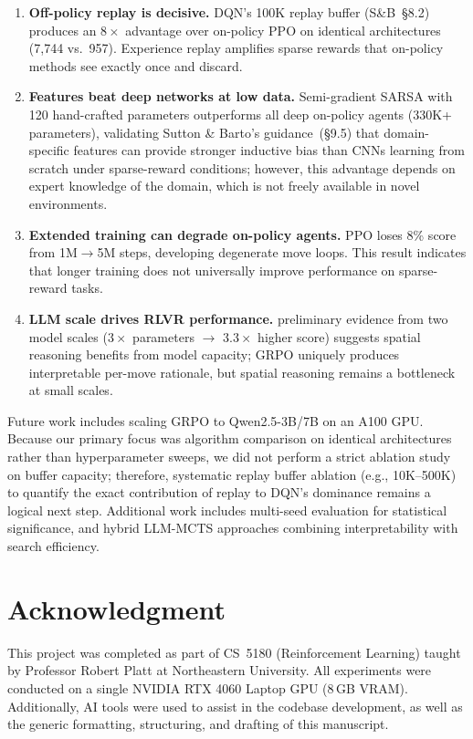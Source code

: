 \documentclass[letterpaper]{article}
\begin{document}
\begin{enumerate}
    \item \textbf{Off-policy replay is decisive.} DQN's 100K replay buffer (S\&B~\S8.2) produces an $8\times$ advantage over on-policy PPO on identical architectures (7,744 vs.\ 957). Experience replay amplifies sparse rewards that on-policy methods see exactly once and discard.

    \item \textbf{Features beat deep networks at low data.} Semi-gradient SARSA with 120 hand-crafted parameters outperforms all deep on-policy agents (330K+ parameters), validating Sutton \& Barto's guidance~(\S9.5) that domain-specific features can provide stronger inductive bias than CNNs learning from scratch under sparse-reward conditions; however, this advantage depends on expert knowledge of the domain, which is not freely available in novel environments.

    \item \textbf{Extended training can degrade on-policy agents.} PPO loses 8\% score from 1M$\to$5M steps, developing degenerate move loops. This result indicates that longer training does not universally improve performance on sparse-reward tasks.

    \item \textbf{LLM scale drives RLVR performance.} preliminary evidence from two model scales ($3\times$ parameters $\to$ $3.3\times$ higher score) suggests spatial reasoning benefits from model capacity; GRPO uniquely produces interpretable per-move rationale, but spatial reasoning remains a bottleneck at small scales.
\end{enumerate}

Future work includes scaling GRPO to Qwen2.5-3B/7B on an A100 GPU. Because our primary focus was algorithm comparison on identical architectures rather than hyperparameter sweeps, we did not perform a strict ablation study on buffer capacity; therefore, systematic replay buffer ablation (e.g., 10K--500K) to quantify the exact contribution of replay to DQN's dominance remains a logical next step. Additional work includes multi-seed evaluation for statistical significance, and hybrid LLM-MCTS approaches combining interpretability with search efficiency.

\section*{Acknowledgment}

This project was completed as part of CS~5180 (Reinforcement Learning) taught by Professor Robert Platt at Northeastern University. All experiments were conducted on a single NVIDIA RTX 4060 Laptop GPU (8\,GB VRAM). Additionally, AI tools were used to assist in the codebase development, as well as the generic formatting, structuring, and drafting of this manuscript.



\end{document}
